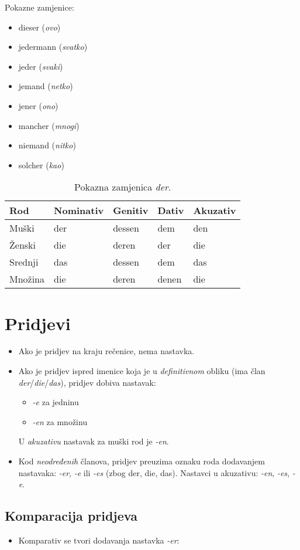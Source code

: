 \documentclass[12pt,german]{article}
\newcommand{\nastavak}[1]{\emph{-#1}}
\newcommand{\clan}[1]{\emph{#1}}
\newcommand{\primjer}[2]{\say{#1 $\longmapsto$ #2}}
\newcommand{\prijevod}[2]{\item #1 (\emph{#2})}
\begin{document}
\begin{multicols}{2}
Pokazne zamjenice:
\begin{itemize}[nolistsep, label={}]
    \prijevod{dieser}{ovo}
    \prijevod{jedermann}{svatko}
    \prijevod{jeder}{svaki}
    \prijevod{jemand}{netko}
    \prijevod{jener}{ono}
    \prijevod{mancher}{mnogi}
    \prijevod{niemand}{nitko}
    \prijevod{solcher}{kao}
\end{itemize}

\begin{table}[H]
\caption{Pokazna zamjenica \emph{der}.}
\begin{tabular}{lllll}
\toprule
Rod & Nominativ & Genitiv & Dativ & Akuzativ \\
\midrule
Muški & der & dessen & dem & den \\
Ženski & die & deren & der & die \\
Srednji & das & dessen & dem & das \\
Množina & die & deren & denen & die \\
\bottomrule
\end{tabular}
\end{table}

\section{Pridjevi}
\begin{itemize}
  \item Ako je pridjev na kraju rečenice, nema nastavka.
  \item Ako je pridjev ispred imenice koja je u \emph{definitivnom} obliku (ima
    član \clan{der}/\clan{die}/\clan{das}), pridjev dobiva nastavak:
  \begin{itemize}[label={}]
    \item \nastavak{e} za jedninu
    \item \nastavak{en} za množinu
  \end{itemize}
  U \emph{akuzativu} nastavak za muški rod je \nastavak{en}.
  \item Kod \emph{neodređenih} članova, pridjev preuzima oznaku roda dodavanjem
    nastavaka: \nastavak{er}, \nastavak{e} ili \nastavak{es} (zbog der, die,
    das). Nastavci u akuzativu: \nastavak{en}, \nastavak{es}, \nastavak{e}.
\end{itemize}

\subsection{Komparacija pridjeva}
\begin{itemize}
  \item Komparativ se tvori dodavanja nastavka \nastavak{er}: \\
    \primjer{sch\"on}{sch\"oner}


\end{itemize}
\end{multicols}
\end{document}
